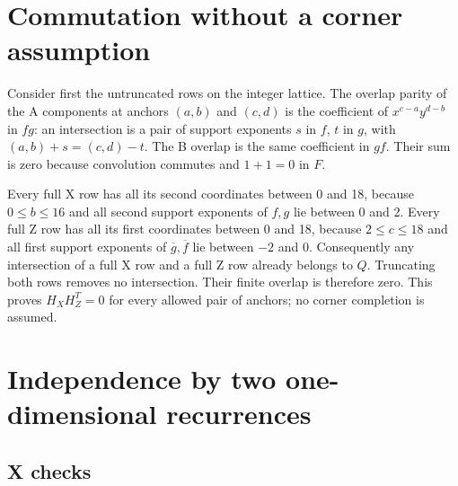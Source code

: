 \documentclass{article}
\begin{document}
\section{Commutation without a corner assumption}\label{sec:commutation}

Consider first the untruncated rows on the integer lattice. The overlap parity
of the A components at anchors \((a,b)\) and \((c,d)\) is the coefficient of
\(x^{c-a} y^{d-b}\) in \(fg\): an intersection is a pair of support exponents
\(s\) in \(f\), \(t\) in \(g\), with \((a,b) + s = (c,d) - t\). The B overlap
is the same coefficient in \(gf\). Their sum is zero because convolution
commutes and \(1 + 1 = 0\) in \(F\).

Every full X row has all its second coordinates between 0 and 18, because
\(0 \le b \le 16\) and all second support exponents of \(f, g\) lie between 0
and 2. Every full Z row has all its first coordinates between 0 and 18,
because \(2 \le c \le 18\) and all first support exponents of
\(\overline{g}, \overline{f}\) lie between \(-2\) and 0. Consequently any
intersection of a full X row and a full Z row already belongs to \(Q\).
Truncating both rows removes no intersection. Their finite overlap is
therefore zero. This proves \(H_X H_Z^T = 0\) for every allowed pair of
anchors; no corner completion is assumed.

\section{Independence by two one-dimensional recurrences}\label{sec:independence}

\subsection{X checks}\label{sec:x-checks}
\end{document}

